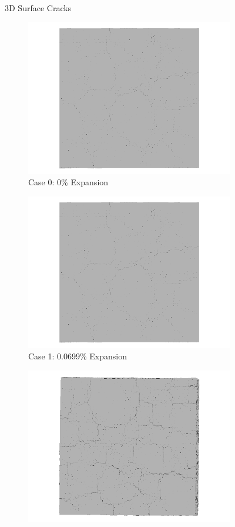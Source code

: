 \begin{figure}[!h]
  \caption{3D Surface Cracks}
  \label{fig:ASR_A15P75_3D}
\end{figure}

\begin{figure}[!h]
\centering

    \begin{subfigure}{.5\textwidth}
      \centering
      \includegraphics[width=.8\linewidth]{Files/exp_3D/ASR/A15P75_1_3ds.png}
    \caption{Case 0: 0\% Expansion}
    \end{subfigure}%
    \begin{subfigure}{.5\textwidth}
      \centering
      \includegraphics[width=.8\linewidth]{Files/exp_3D/ASR/A15P75_1_3ds.png}
    \caption{Case 1: 0.0699\% Expansion}
    \end{subfigure}
    \begin{subfigure}{.5\textwidth}
      \centering
      \includegraphics[width=.8\linewidth]{Files/exp_3D/ASR/A15P75_2_3ds.png}

\end{subfigure}
\end{figure}
